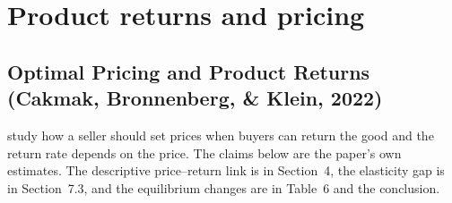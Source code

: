 \documentclass[11pt]{article}
\begin{document}
\section{Product returns and pricing}

\subsection{Optimal Pricing and Product Returns (Cakmak, Bronnenberg, \& Klein, 2022)}

\citet{cakmak_optimal_2022} study how a seller should set prices when buyers can return the good and the return rate depends on the price. The claims below are the paper's own estimates. The descriptive price--return link is in Section~4, the elasticity gap is in Section~7.3, and the equilibrium changes are in Table~6 and the conclusion.
\end{document}
